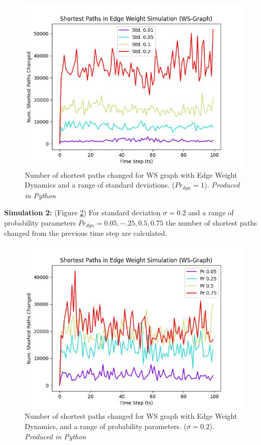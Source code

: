 \documentclass[
	a4paper, %
	10pt, %
	unnumberedsections, %
	twoside, %
]{LTJournalArticle}
\begin{document}
\begin{figure}[H]
	\includegraphics[width=\linewidth]{Figures/ewd/ew1_paths_std.jpg}
	\caption{Number of shortest paths changed for WS graph with Edge Weight Dynamics and a range of standard deviations. (\(Pr_{dyn} = 1\)). \emph{Produced in Python}}
	\label{fig:ewd_ex1}
\end{figure}

\textbf{Simulation 2:} (Figure \ref{fig:ewd_ex2}) For standard deviation \(\sigma = 0.2\) and a range of probability parameters \(Pr_{dyn} = 0.05, -.25, 0.5, 0.75\) the number of shortest paths changed from the previous time step are calculated.

\begin{figure}[H]
	\includegraphics[width=\linewidth]{Figures/ewd/ew1_paths_prob.jpg}
	\caption{Number of shortest paths changed for WS graph with Edge Weight Dynamics, and a range of probability parameters. (\(\sigma = 0.2\)). \emph{Produced in Python}}
	\label{fig:ewd_ex2}
\end{figure}
\end{document}
